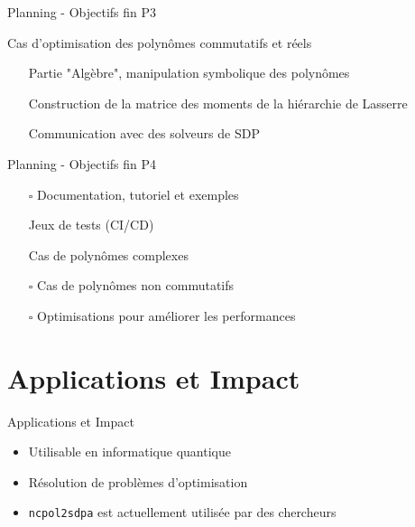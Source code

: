 \documentclass{beamer}
\begin{document}
\begin{frame}{Planning - Objectifs fin P3}

Cas d'optimisation des polynômes commutatifs et réels
\begin{itemize}
    \item[\checkmark] Partie "Algèbre", manipulation symbolique des polynômes
    \item[\checkmark] Construction de la matrice des moments de la hiérarchie de Lasserre
    \item[\checkmark] Communication avec des solveurs de SDP
\end{itemize}
\end{frame}

\begin{frame}{Planning - Objectifs fin P4}

\begin{itemize}
    \item[$\square$] Documentation, tutoriel et exemples
    \item[\checkmark] Jeux de tests (CI/CD)
    \item[\checkmark] Cas de polynômes complexes
    \item[$\square$] Cas de polynômes non commutatifs
    \item[$\square$] Optimisations pour améliorer les performances
\end{itemize}
\end{frame}

\section{Applications et Impact}

\begin{frame}{Applications et Impact}
\begin{itemize}
    \item Utilisable en informatique quantique
    \item Résolution de problèmes d'optimisation
    \item \texttt{ncpol2sdpa} est actuellement utilisée par des chercheurs
\end{itemize}
\end{frame}
\end{document}
